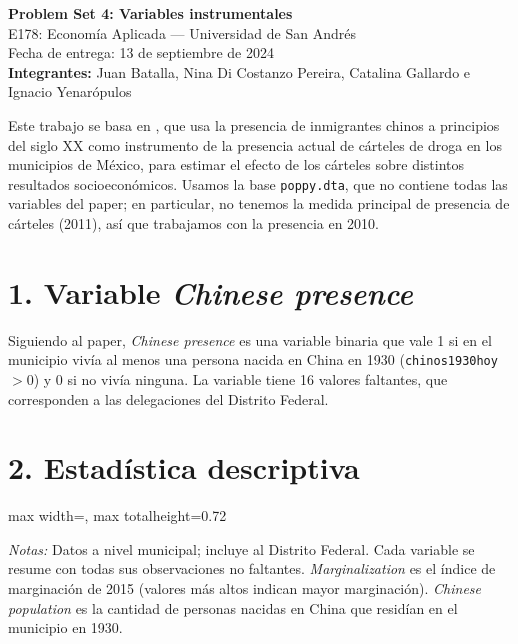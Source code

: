 \documentclass[11pt,a4paper]{article}
\newcommand{\tabla}[1]{\begin{adjustbox}{max width=\linewidth, max totalheight=0.72\textheight}\end{adjustbox}}
\newcommand{\notas}[1]{\par\vspace{0.3em}\begin{minipage}{0.92\linewidth}\footnotesize\textit{Notas:} #1\end{minipage}}
\begin{document}
\begin{center}
{\Large\bfseries Problem Set 4: Variables instrumentales}\\[0.5em]
E178: Economía Aplicada --- Universidad de San Andrés\\
Fecha de entrega: 13 de septiembre de 2024\\[0.5em]
\textbf{Integrantes:} Juan Batalla, Nina Di Costanzo Pereira, Catalina Gallardo e Ignacio Yenarópulos
\end{center}

Este trabajo se basa en \citet{murphy}, que usa la presencia de inmigrantes chinos a principios del siglo XX como instrumento de la presencia actual de cárteles de droga en los municipios de México, para estimar el efecto de los cárteles sobre distintos resultados socioeconómicos. Usamos la base \texttt{poppy.dta}, que no contiene todas las variables del paper; en particular, no tenemos la medida principal de presencia de cárteles (2011), así que trabajamos con la presencia en 2010.

\section*{1. Variable \textit{Chinese presence}}

Siguiendo al paper, \textit{Chinese presence} es una variable binaria que vale 1 si en el municipio vivía al menos una persona nacida en China en 1930 (\texttt{chinos1930hoy} $>0$) y 0 si no vivía ninguna. La variable tiene 16 valores faltantes, que corresponden a las delegaciones del Distrito Federal.

\section*{2. Estadística descriptiva}

\begin{table}[H]\centering
\caption{Estadísticas descriptivas}\label{tab:desc}
\small
\tabla{"../output/Tabla 1.tex"}
\notas{Datos a nivel municipal; incluye al Distrito Federal. Cada variable se resume con todas sus observaciones no faltantes. \textit{Marginalization} es el índice de marginación de 2015 (valores más altos indican mayor marginación). \textit{Chinese population} es la cantidad de personas nacidas en China que residían en el municipio en 1930.}
\end{table}
\end{document}
